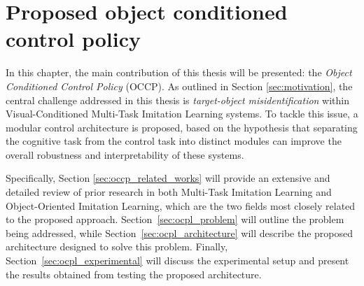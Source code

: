 \chapter{Proposed object conditioned control policy}
\label{ch:occp}
In this chapter, the main contribution of this thesis will be presented: the \textit{Object Conditioned Control Policy} (OCCP). As outlined in Section \ref{sec:motivation}, the central challenge addressed in this thesis is \textit{target-object misidentification} within Visual-Conditioned Multi-Task Imitation Learning systems. To tackle this issue, a modular control architecture is proposed, based on the hypothesis that separating the cognitive task from the control task into distinct modules can improve the overall robustness and interpretability of these systems.

Specifically, Section \ref{sec:occp_related_works} will provide an extensive and detailed review of prior research in both Multi-Task Imitation Learning and Object-Oriented Imitation Learning, which are the two fields most closely related to the proposed approach. Section~\ref{sec:ocpl_problem} will outline the problem being addressed, while Section~\ref{sec:ocpl_architecture} will describe the proposed architecture designed to solve this problem. Finally, Section~\ref{sec:ocpl_experimental} will discuss the experimental setup and present the results obtained from testing the proposed architecture.





